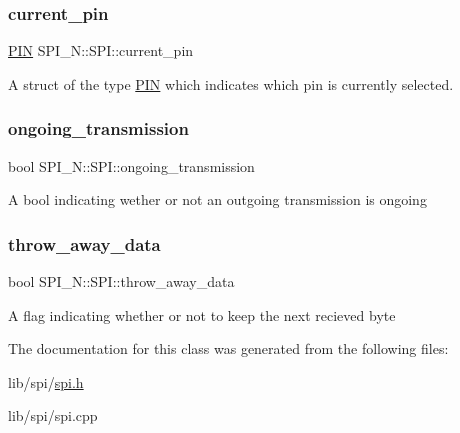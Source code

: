 \subsubsection{\texorpdfstring{current\+\_\+pin}{current\_pin}}
{\footnotesize\ttfamily \hyperlink{struct_s_p_i___n_1_1_p_i_n}{P\+IN} S\+P\+I\+\_\+\+N\+::\+S\+P\+I\+::current\+\_\+pin\hspace{0.3cm}{\ttfamily [private]}}

A struct of the type \hyperlink{struct_s_p_i___n_1_1_p_i_n}{P\+IN} which indicates which pin is currently selected. \hypertarget{class_s_p_i___n_1_1_s_p_i_aff61d4bfc6a6e0088c3653898b1e91b8}{}\label{class_s_p_i___n_1_1_s_p_i_aff61d4bfc6a6e0088c3653898b1e91b8} 
\subsubsection{\texorpdfstring{ongoing\+\_\+transmission}{ongoing\_transmission}}
{\footnotesize\ttfamily bool S\+P\+I\+\_\+\+N\+::\+S\+P\+I\+::ongoing\+\_\+transmission\hspace{0.3cm}{\ttfamily [private]}}

A bool indicating wether or not an outgoing transmission is ongoing \hypertarget{class_s_p_i___n_1_1_s_p_i_a7b2d300478662920e6911cea751e1094}{}\label{class_s_p_i___n_1_1_s_p_i_a7b2d300478662920e6911cea751e1094} 
\subsubsection{\texorpdfstring{throw\+\_\+away\+\_\+data}{throw\_away\_data}}
{\footnotesize\ttfamily bool S\+P\+I\+\_\+\+N\+::\+S\+P\+I\+::throw\+\_\+away\+\_\+data\hspace{0.3cm}{\ttfamily [private]}}

A flag indicating whether or not to keep the next recieved byte 

The documentation for this class was generated from the following files\+:\begin{DoxyCompactItemize}
\item 
lib/spi/\hyperlink{spi_8h}{spi.\+h}\item 
lib/spi/spi.\+cpp\end{DoxyCompactItemize}
